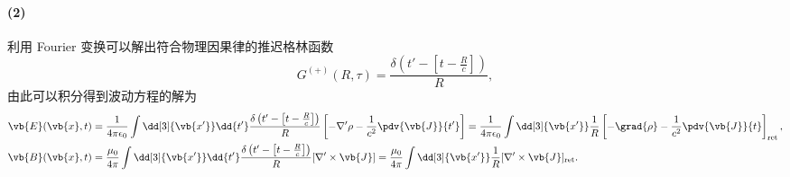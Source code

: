 \documentclass[12pt]{article}
\begin{document}
\paragraph{(2)}
利用 Fourier 变换可以解出符合物理因果律的推迟格林函数
\begin{equation*}
  G^{(+)}(R, \tau) = \frac{\delta \left(t' - \left[t - \frac{R}{c}\right]\right)}{R},
\end{equation*}
由此可以积分得到波动方程的解为
\begin{align}
  \vb{E}(\vb{x}, t) &= \frac{1}{4\pi \epsilon_0} \int \dd[3]{\vb{x'}} \dd{t'} \frac{\delta \left(t' - \left[t - \frac{R}{c}\right]\right)}{R} \left[-\nabla' \rho - \frac{1}{c^2} \pdv{\vb{J}}{t'}\right] 
  = \frac{1}{4\pi \epsilon_0} \int \dd[3]{\vb{x'}} \frac{1}{R} \left[-\grad{\rho} - \frac{1}{c^2} \pdv{\vb{J}}{t}\right]_{\mathrm{ret}}, \\
  \vb{B}(\vb{x}, t) &= \frac{\mu_0}{4\pi} \int \dd[3]{\vb{x'}} \dd{t'} \frac{\delta \left(t' - \left[t - \frac{R}{c}\right]\right)}{R} [\nabla' \times \vb{J}]
  = \frac{\mu_0}{4\pi} \int \dd[3]{\vb{x'}} \frac{1}{R} [\nabla' \times \vb{J}]_{\mathrm{ret}}.
\end{align}
\end{document}
